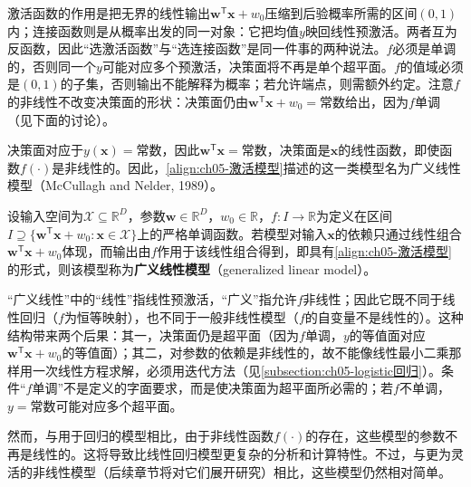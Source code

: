\documentclass[../../main.tex]{subfiles}
\begin{document}
\begin{remark}
激活函数的作用是把无界的线性输出$\boldsymbol{w}^{\mathsf{T}}\boldsymbol{x}+w_0$压缩到后验概率所需的区间$(0,1)$内；连接函数则是从概率出发的同一对象：它把均值$y$映回线性预激活。两者互为反函数，因此“选激活函数”与“选连接函数”是同一件事的两种说法。$f$必须是单调的，否则同一个$y$可能对应多个预激活，决策面将不再是单个超平面。$f$的值域必须是$(0,1)$的子集，否则输出不能解释为概率；若允许端点，则需额外约定。注意$f$的非线性不改变决策面的形状：决策面仍由$\boldsymbol{w}^{\mathsf{T}}\boldsymbol{x}+w_0=\text{常数}$给出，因为$f$单调（见下面的讨论）。
\end{remark}

决策面对应于$y(\boldsymbol{x})=\text{常数}$，因此$\boldsymbol{w}^{\mathsf{T}}\boldsymbol{x}=\text{常数}$，决策面是$\boldsymbol{x}$的线性函数，即使函数$f(\cdot)$是非线性的。因此，\eqref{align:ch05-激活模型}描述的这一类模型名为广义线性模型（McCullagh and Nelder, 1989）。

\begin{definition}[广义线性模型]\label{definition:ch05-广义线性模型}
设输入空间为$\mathcal{X}\subseteq\mathbb{R}^{D}$，参数$\boldsymbol{w}\in\mathbb{R}^{D}$，$w_0\in\mathbb{R}$，$f:I\to\mathbb{R}$为定义在区间$I\supseteq\{\boldsymbol{w}^{\mathsf{T}}\boldsymbol{x}+w_0:\boldsymbol{x}\in\mathcal{X}\}$上的严格单调函数。若模型对输入$\boldsymbol{x}$的依赖只通过线性组合$\boldsymbol{w}^{\mathsf{T}}\boldsymbol{x}+w_0$体现，而输出由$f$作用于该线性组合得到，即具有\eqref{align:ch05-激活模型}的形式，则该模型称为\textbf{广义线性模型}（generalized linear model）。
\end{definition}

\begin{remark}
“广义线性”中的“线性”指线性预激活，“广义”指允许$f$非线性；因此它既不同于线性回归（$f$为恒等映射），也不同于一般非线性模型（$f$的自变量不是线性的）。这种结构带来两个后果：其一，决策面仍是超平面（因为$f$单调，$y$的等值面对应$\boldsymbol{w}^{\mathsf{T}}\boldsymbol{x}+w_0$的等值面）；其二，对参数的依赖是非线性的，故不能像线性最小二乘那样用一次线性方程求解，必须用迭代方法（见\cref{subsection:ch05-logistic回归}）。条件“$f$单调”不是定义的字面要求，而是使决策面为超平面所必需的；若$f$不单调，$y=\text{常数}$可能对应多个超平面。
\end{remark}

然而，与用于回归的模型相比，由于非线性函数$f(\cdot)$的存在，这些模型的参数不再是线性的。这将导致比线性回归模型更复杂的分析和计算特性。不过，与更为灵活的非线性模型（后续章节将对它们展开研究）相比，这些模型仍然相对简单。
\end{document}
